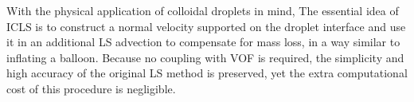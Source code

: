 With the physical application of colloidal droplets in mind, 
 The essential idea of ICLS is to construct a normal velocity supported on the droplet interface and use it in an additional LS advection to compensate for mass loss, in a way similar to inflating a balloon. Because no coupling with VOF  is required, the simplicity and high accuracy of the original LS method is preserved, yet the extra computational cost of this procedure is negligible.


